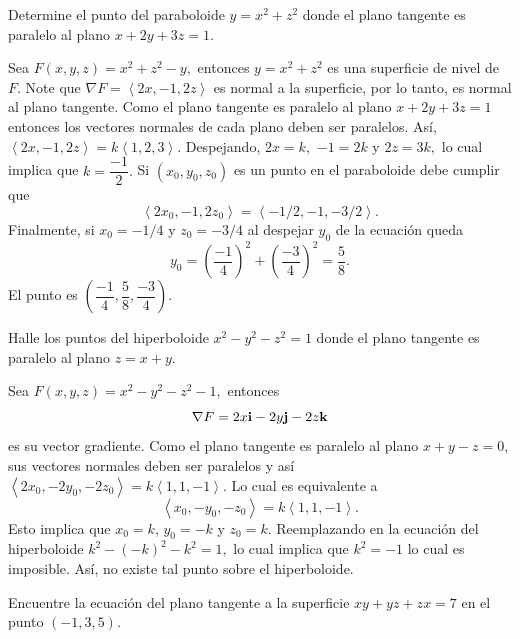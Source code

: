 \begin{prob}
Determine el punto del paraboloide $y=x^2+z^2$ donde el plano tangente es paralelo al plano $x+2y+3z=1.$
\begin{myproof}
Sea $F(x,y,z)=x^2+z^2-y,$ entonces $y=x^2+z^2$ es una superficie de nivel de $F.$ Note que $\nabla F=\left\langle 2x,-1,2z \right\rangle$ es normal a la superficie, por lo tanto, es normal al plano tangente. Como el plano tangente es paralelo al plano $x+2y+3z=1$ entonces los vectores normales de cada plano deben ser paralelos. Así, $\left\langle 2x,-1,2z \right\rangle=k\left\langle 1,2,3 \right\rangle.$
Despejando, $2x=k,$ $-1=2k$ y $2z=3k,$ lo cual implica que $k=\dfrac{-1}{2}.$ 
Si $(x_0,y_0,z_0)$ es un punto en el paraboloide debe cumplir que $$\left\langle 2x_0,-1,2z_0 \right\rangle=\left\langle -1/2,-1,-3/2 \right\rangle.$$
Finalmente, si $x_0=-1/4$ y $z_0=-3/4$ al despejar $y_0$ de la ecuación queda $$y_0=\left( \frac{-1}{4} \right)^2+\left( \frac{-3}{4} \right)^2=\frac{5}{8}.$$ El punto es $\left( \dfrac{-1}{4},\dfrac{5}{8},\dfrac{-3}{4} \right).$
\end{myproof}
\end{prob}

\begin{prob}
Halle los puntos del hiperboloide $x^2-y^2-z^2=1$ donde el plano tangente es paralelo al plano $z = x + y.$
\begin{myproof}
Sea $F(x,y,z)=x^2-y^2-z^2-1,$ entonces $$\nabla F=2x{\bf i}-2y{\bf j}-2z{\bf k}$$ es su vector gradiente. Como el plano tangente es paralelo al plano $x+y-z=0,$ sus vectores normales deben ser paralelos y así $ \left\langle 2x_0,-2y_0,-2z_0\right\rangle =k \left\langle 1,1,-1\right\rangle. $ Lo cual es equivalente a $$ \left\langle x_0,-y_0,-z_0\right\rangle =k \left\langle 1,1,-1\right\rangle. $$
Esto implica que  $x_0=k$, $y_0=-k$ y $z_0=k.$ Reemplazando en la ecuación del hiperboloide $k^2-(-k)^2-k^2=1,$ lo cual implica que $k^2=-1$ lo cual es imposible. Así, no existe tal punto sobre el hiperboloide.
\end{myproof}
\end{prob}

\begin{prob}
Encuentre la ecuación del plano tangente a la superficie $xy+yz+zx=7$ en el punto $(-1,3,5).$
\end{prob}

